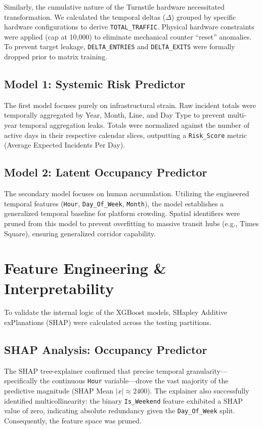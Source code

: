 \documentclass[conference]{IEEEtran}
\begin{document}
Similarly, the cumulative nature of the Turnstile hardware necessitated transformation. We calculated the temporal deltas ($\Delta$) grouped by specific hardware configurations to derive \texttt{TOTAL\_TRAFFIC}. Physical hardware constraints were applied (cap at 10,000) to eliminate mechanical counter ``reset'' anomalies. To prevent target leakage, \texttt{DELTA\_ENTRIES} and \texttt{DELTA\_EXITS} were formally dropped prior to matrix training.

\subsection{Model 1: Systemic Risk Predictor}
The first model focuses purely on infrastructural strain. Raw incident totals were temporally aggregated by Year, Month, Line, and Day Type to prevent multi-year temporal aggregation leaks. Totals were normalized against the number of active days in their respective calendar slices, outputting a \texttt{Risk\_Score} metric (Average Expected Incidents Per Day). 

\subsection{Model 2: Latent Occupancy Predictor}
The secondary model focuses on human accumulation. Utilizing the engineered temporal features (\texttt{Hour}, \texttt{Day\_Of\_Week}, \texttt{Month}), the model establishes a generalized temporal baseline for platform crowding. Spatial identifiers were pruned from this model to prevent overfitting to massive transit hubs (e.g., Times Square), ensuring generalized corridor capability.

\section{Feature Engineering \& Interpretability}
To validate the internal logic of the XGBoost models, SHapley Additive exPlanations (SHAP) were calculated across the testing partitions.

\subsection{SHAP Analysis: Occupancy Predictor}
The SHAP tree-explainer confirmed that precise temporal granularity—specifically the continuous \texttt{Hour} variable—drove the vast majority of the predictive magnitude (SHAP Mean $|x| \approx 2400$). The explainer also successfully identified multicollinearity: the binary \texttt{Is\_Weekend} feature exhibited a SHAP value of zero, indicating absolute redundancy given the \texttt{Day\_Of\_Week} split. Consequently, the feature space was pruned.
\end{document}
